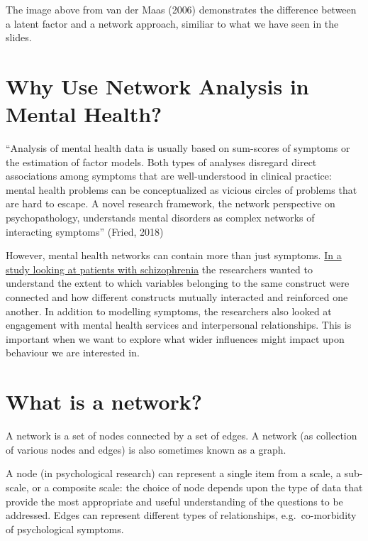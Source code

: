 \documentclass[]{book}
\begin{document}
The image above from van der Maas (2006) demonstrates the difference between a latent factor and a network approach, similiar to what we have seen in the slides.

\hypertarget{why-use-network-analysis-in-mental-health}{%
\section{Why Use Network Analysis in Mental Health?}\label{why-use-network-analysis-in-mental-health}}

``Analysis of mental health data is usually based on sum-scores of symptoms or the estimation of factor models. Both types of analyses disregard direct associations among symptoms that are well-understood in clinical practice: mental health problems can be conceptualized as vicious circles of problems that are hard to escape. A novel research framework, the network perspective on psychopathology, understands mental disorders as complex networks of interacting symptoms'' (Fried, 2018)

However, mental health networks can contain more than just symptoms. \href{https://jamanetwork.com/journals/jamapsychiatry/fullarticle/2671414?casa_token=nGUSw-yIg1YAAAAA\%3aXJz4Ehq44lBBE3iDqQhuNSGgJfafMX9lGyiDx9YxHJpVSFVOJo0gkA0NdrEGhY9T-6mvlB17}{In a study looking at patients with schizophrenia} the researchers wanted to understand the extent to which variables belonging to the same construct were connected and how different constructs mutually interacted and reinforced one another. In addition to modelling symptoms, the researchers also looked at engagement with mental health services and interpersonal relationships. This is important when we want to explore what wider influences might impact upon behaviour we are interested in.

\hypertarget{what-is-a-network}{%
\section{What is a network?}\label{what-is-a-network}}

A network is a set of nodes connected by a set of edges. A network (as collection of various nodes and edges) is also sometimes known as a graph.

A node (in psychological research) can represent a single item from a scale, a sub-scale, or a composite scale: the choice of node depends upon the type of data that provide the most appropriate and useful understanding of the questions to be addressed. Edges can represent different types of relationships, e.g.~co-morbidity of psychological symptoms.
\end{document}
